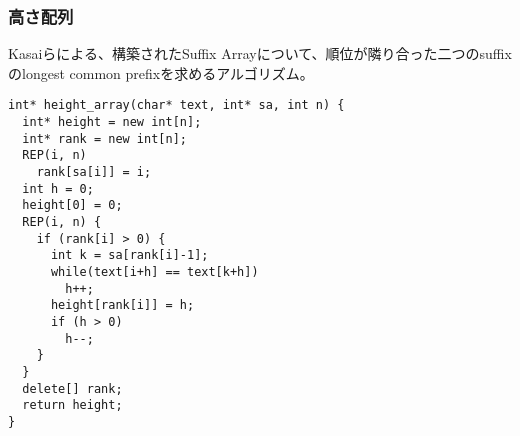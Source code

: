 \subsubsection{高さ配列}

Kasaiらによる、構築されたSuffix Arrayについて、順位が隣り合った二つのsuffixのlongest common prefixを求めるアルゴリズム。

\begin{lstlisting}
int* height_array(char* text, int* sa, int n) {
  int* height = new int[n];
  int* rank = new int[n];
  REP(i, n)
    rank[sa[i]] = i;
  int h = 0;
  height[0] = 0;
  REP(i, n) {
    if (rank[i] > 0) {
      int k = sa[rank[i]-1];
      while(text[i+h] == text[k+h])
        h++;
      height[rank[i]] = h;
      if (h > 0)
        h--;
    }
  }
  delete[] rank;
  return height;
}
\end{lstlisting}



\newpage
